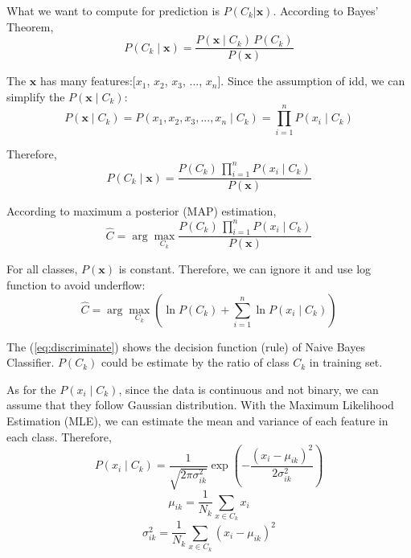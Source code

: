 \documentclass[a4paper,12pt]{article}
\begin{document}
What we want to compute for prediction is $P(C_k|\mathbf{x})$. According to Bayes' Theorem,
\begin{equation}
P(C_k \mid \mathbf{x}) = \frac{P(\mathbf{x} \mid C_k) \, P(C_k)}{P(\mathbf{x})}
\label{eq:bayes}
\end{equation}

The $\mathbf{x}$ has many features:[$x_1$, $x_2$, $x_3$, ..., $x_n$]. Since the assumption of idd, we can simplify the $P(\mathbf{x} \mid C_k)$:
\begin{equation}
P(\mathbf{x} \mid C_k) = P(x_1, x_2, x_3, ..., x_n \mid C_k) = \prod_{i=1}^{n} P(x_i \mid C_k)
\label{eq:idd}
\end{equation}

Therefore,
\begin{equation}
P(C_k \mid \mathbf{x})=\frac{P(C_k)\,\prod_{i=1}^{n} P(x_i \mid C_k)}{P(\mathbf{x})}
\end{equation}

According to maximum a posterior (MAP) estimation,
\begin{equation}
\hat{C} = \arg\max_{C_k}\frac{P(C_k)\,\prod_{i=1}^{n} P(x_i \mid C_k)}{P(\mathbf{x})}
\end{equation}

For all classes, $P(\mathbf{x})$ is constant. Therefore, we can ignore it and use log function to avoid underflow:
\begin{equation}
\hat{C} = \arg\max_{C_k}\left(\ln P(C_k) + \sum_{i=1}^{n} \ln P(x_i \mid C_k)\right)
\label{eq:discriminate}
\end{equation}

The (\ref{eq:discriminate}) shows the decision function (rule) of Naive Bayes Classifier. $P(C_k)$ could be estimate by the ratio of class $C_k$ in training set. 

As for the $P(x_i \mid C_k)$, since the data is continuous and not binary, we can assume that they follow Gaussian distribution. With the Maximum Likelihood Estimation
(MLE), we can estimate the mean and variance of each feature in each class. Therefore,
\begin{equation}
P(x_i \mid C_k) = \frac{1}{\sqrt{2\pi\sigma_{ik}^2}} \exp\left(-\frac{(x_i - \mu_{ik})^2}{2\sigma_{ik}^2}\right)
\end{equation}
\begin{equation}
    \mu_{ik} = \frac{1}{N_k} \sum_{x \in C_k} x_i
\end{equation}
\begin{equation}
    \sigma_{ik}^2 = \frac{1}{N_k} \sum_{x \in C_k} (x_i - \mu_{ik})^2
\end{equation}
\end{document}
